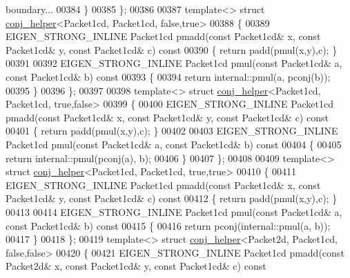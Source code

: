 \begin{DoxyCode}
{       boundary...}
00384   \}
00385 \};
00386 
00387 \textcolor{keyword}{template}<> \textcolor{keyword}{struct }\hyperlink{struct_eigen_1_1internal_1_1conj__helper}{conj\_helper}<Packet1cd, Packet1cd, false,true>
00388 \{
00389   EIGEN\_STRONG\_INLINE Packet1cd pmadd(\textcolor{keyword}{const} Packet1cd& x, \textcolor{keyword}{const} Packet1cd& y, \textcolor{keyword}{const} Packet1cd& c)\textcolor{keyword}{ const}
00390 \textcolor{keyword}{  }\{ \textcolor{keywordflow}{return} padd(pmul(x,y),c); \}
00391 
00392   EIGEN\_STRONG\_INLINE Packet1cd pmul(\textcolor{keyword}{const} Packet1cd& a, \textcolor{keyword}{const} Packet1cd& b)\textcolor{keyword}{ const}
00393 \textcolor{keyword}{  }\{
00394     \textcolor{keywordflow}{return} internal::pmul(a, pconj(b));
00395   \}
00396 \};
00397 
00398 \textcolor{keyword}{template}<> \textcolor{keyword}{struct }\hyperlink{struct_eigen_1_1internal_1_1conj__helper}{conj\_helper}<Packet1cd, Packet1cd, true,false>
00399 \{
00400   EIGEN\_STRONG\_INLINE Packet1cd pmadd(\textcolor{keyword}{const} Packet1cd& x, \textcolor{keyword}{const} Packet1cd& y, \textcolor{keyword}{const} Packet1cd& c)\textcolor{keyword}{ const}
00401 \textcolor{keyword}{  }\{ \textcolor{keywordflow}{return} padd(pmul(x,y),c); \}
00402 
00403   EIGEN\_STRONG\_INLINE Packet1cd pmul(\textcolor{keyword}{const} Packet1cd& a, \textcolor{keyword}{const} Packet1cd& b)\textcolor{keyword}{ const}
00404 \textcolor{keyword}{  }\{
00405     \textcolor{keywordflow}{return} internal::pmul(pconj(a), b);
00406   \}
00407 \};
00408 
00409 \textcolor{keyword}{template}<> \textcolor{keyword}{struct }\hyperlink{struct_eigen_1_1internal_1_1conj__helper}{conj\_helper}<Packet1cd, Packet1cd, true,true>
00410 \{
00411   EIGEN\_STRONG\_INLINE Packet1cd pmadd(\textcolor{keyword}{const} Packet1cd& x, \textcolor{keyword}{const} Packet1cd& y, \textcolor{keyword}{const} Packet1cd& c)\textcolor{keyword}{ const}
00412 \textcolor{keyword}{  }\{ \textcolor{keywordflow}{return} padd(pmul(x,y),c); \}
00413 
00414   EIGEN\_STRONG\_INLINE Packet1cd pmul(\textcolor{keyword}{const} Packet1cd& a, \textcolor{keyword}{const} Packet1cd& b)\textcolor{keyword}{ const}
00415 \textcolor{keyword}{  }\{
00416     \textcolor{keywordflow}{return} pconj(internal::pmul(a, b));
00417   \}
00418 \};
00419 \textcolor{keyword}{template}<> \textcolor{keyword}{struct }\hyperlink{struct_eigen_1_1internal_1_1conj__helper}{conj\_helper}<Packet2d, Packet1cd, false,false>
00420 \{
00421   EIGEN\_STRONG\_INLINE Packet1cd pmadd(\textcolor{keyword}{const} Packet2d& x, \textcolor{keyword}{const} Packet1cd& y, \textcolor{keyword}{const} Packet1cd& c)\textcolor{keyword}{ const}

\end{DoxyCode}
